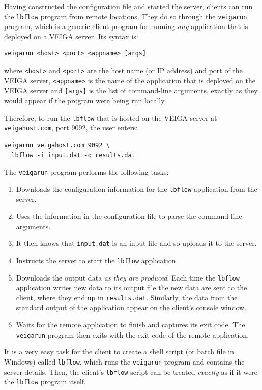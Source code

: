 \documentclass[a4paper]{article}
\begin{document}
\begin{multicols}{2}
Having constructed the configuration file and started the server, clients can run the {\tt lbflow} program from remote locations.  They do so through the {\tt veigarun} program, which is a generic client program for running {\em any\/} application that is deployed on a VEIGA server.  Its syntax is:

\begin{verbatim}
veigarun <host> <port> <appname> [args]
\end{verbatim}
where {\tt <host>} and {\tt <port>\/} are the host name (or IP address) and port of the VEIGA server, {\tt <appname>} is the name of the application that is deployed on the VEIGA server and {\tt [args]} is the list of command-line arguments, exactly as they would appear if the program were being run locally.

Therefore, to run the {\tt lbflow} that is hosted on the VEIGA server at {\tt veigahost.com}, port 9092, the user enters:

\begin{verbatim}
veigarun veigahost.com 9092 \
  lbflow -i input.dat -o results.dat
\end{verbatim}

The {\tt veigarun} program performs the following tasks:

\begin{enumerate}
\item Downloads the configuration information for the {\tt lbflow} application from the server.
\item Uses the information in the configuration file to parse the command-line arguments.
\item It then knows that {\tt input.dat} is an input file and so uploads it to the server.
\item Instructs the server to start the {\tt lbflow} application.
\item Downloads the output data {\em as they are produced\/}. Each time the {\tt lbflow} application writes new data to its output file the new data are sent to the client, where they end up in {\tt results.dat}.  Similarly, the data from the standard output of the application appear on the client's console window.
\item Waits for the remote application to finish and captures its exit code.  The {\tt veigarun} program then exits with the exit code of the remote application.
\end{enumerate}

It is a very easy task for the client to create a shell script (or batch file in Windows) called {\tt lbflow}, which runs the {\tt veigarun} program and contains the server details.  Then, the client's {\tt lbflow} script can be treated {\em exactly\/} as if it were the {\tt lbflow} program itself.


\end{multicols}
\end{document}
